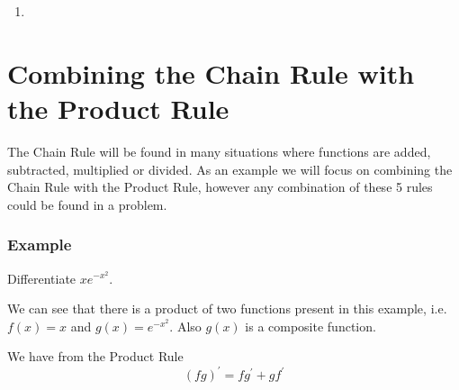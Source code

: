 \begin{enumerate}
\item   
\columnsep =30pt
 \end{enumerate}


\section{Combining the Chain Rule with the Product Rule}
The Chain Rule will be found in many situations where functions are added, subtracted, multiplied or divided. As
an example we will focus on combining the Chain Rule with the Product Rule, however any combination of these 5 rules could be found in a problem. 

\subsubsection{Example}
Differentiate $x e^{ -x^{2}}$. 

We can see that there is a product of two functions present in this example, i.e. $f (x) =x$ and $g (x) =e^{ -x^{2}}$. Also $g (x)$ is a composite function. 

We have from the Product Rule
\begin{equation*}\left (f g\right )^{ \prime } =f g^{ \prime } +g f^{ \prime }
\end{equation*}


